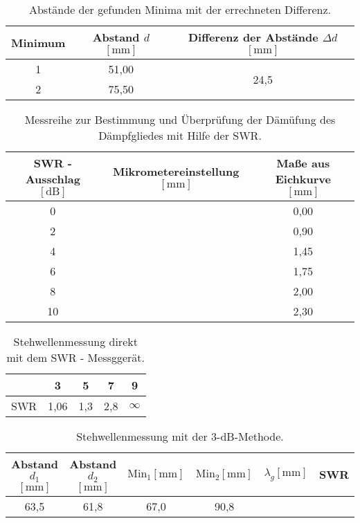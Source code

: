        \begin{table}
           \centering
           \caption{Abstände der gefunden Minima mit der errechneten Differenz.}
           \label{tab:Messreihe21}
           \begin{tabular}{c c | c}
               \toprule
               Minimum & Abstand $d$ $[\si{\milli\meter}]$ & Differenz der Abstände $ \Delta d$ $ [\si{\milli\meter}]$ \\
               \midrule
               1 & 51,00 & \multirow{2}{*}{24,5} \\
               2 & 75,50 &  \\
           \end{tabular}
       \end{table}


\begin{table}
    \centering
    \caption{Messreihe zur Bestimmung und Überprüfung der Dämüfung des Dämpfgliedes mit Hilfe der SWR.}
    \label{tab:Messreihe22}
    \begin{tabular}{c c c}
        \toprule
       SWR - Ausschlag $[\si{\dB}]$ & Mikrometereinstellung $[\si{\milli\meter}]$ & Maße aus Eichkurve $[\si{\milli\meter}]$  \\
        \midrule
        0   & ~ & 0,00 \\
        2   & ~ & 0,90 \\
        4   & ~ & 1,45 \\
        6   & ~ & 1,75 \\
        8   & ~ & 2,00 \\
        10  & ~ & 2,30 \\        
    \end{tabular}
\end{table}


\begin{table}
    \centering
    \caption{Stehwellenmessung direkt mit dem SWR - Messggerät. }
    \label{tab:Messreihe31}
    \begin{tabular}{c c c c c}
        \toprule
        ~ &  3 & 5 & 7 & 9 \\
        \midrule
       SWR & 1,06 & 1,3 & 2,8 & $\infty$ \\   
     \end{tabular}
\end{table}

\begin{table}
    \centering
    \caption{Stehwellenmessung mit der 3-dB-Methode.}
    \label{tab:Messreihe32}
    \begin{tabular}{c c c c c c }
        \toprule
        Abstand $d_1$ $[\si{\milli\meter}]$ & Abstand $d_2$ $[\si{\milli\meter}]$ & $\text{Min}_1 [\si{\milli\meter}]$&  $\text{Min}_2 [\si{\milli\meter}]$ & $\lambda_g [\si{\milli\meter}]$ & SWR \\
        \midrule
        63,5 & 61,8  & 67,0  & 90,8 & & \\   
     \end{tabular}
\end{table}

